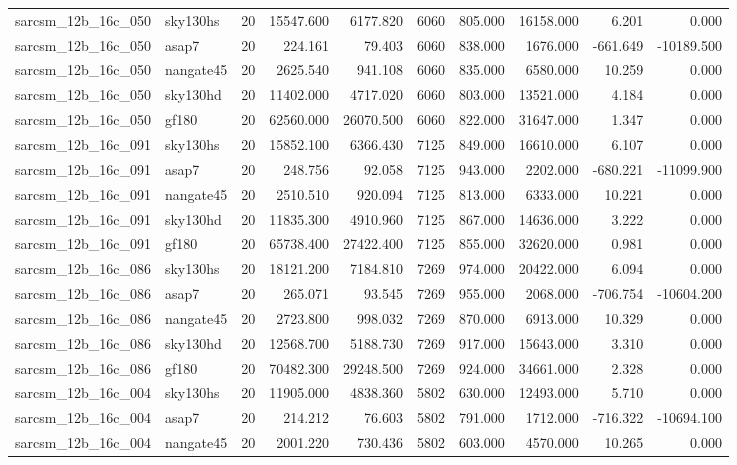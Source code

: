 \documentclass{article}
\begin{document}
\begin{longtable}{llrrrrrrrr}
sarcsm\_12b\_16c\_050 & sky130hs & 20 & 15547.600 & 6177.820 & 6060 & 805.000 & 16158.000 & 6.201 & 0.000 \\
sarcsm\_12b\_16c\_050 & asap7 & 20 & 224.161 & 79.403 & 6060 & 838.000 & 1676.000 & -661.649 & -10189.500 \\
sarcsm\_12b\_16c\_050 & nangate45 & 20 & 2625.540 & 941.108 & 6060 & 835.000 & 6580.000 & 10.259 & 0.000 \\
sarcsm\_12b\_16c\_050 & sky130hd & 20 & 11402.000 & 4717.020 & 6060 & 803.000 & 13521.000 & 4.184 & 0.000 \\
sarcsm\_12b\_16c\_050 & gf180 & 20 & 62560.000 & 26070.500 & 6060 & 822.000 & 31647.000 & 1.347 & 0.000 \\
sarcsm\_12b\_16c\_091 & sky130hs & 20 & 15852.100 & 6366.430 & 7125 & 849.000 & 16610.000 & 6.107 & 0.000 \\
sarcsm\_12b\_16c\_091 & asap7 & 20 & 248.756 & 92.058 & 7125 & 943.000 & 2202.000 & -680.221 & -11099.900 \\
sarcsm\_12b\_16c\_091 & nangate45 & 20 & 2510.510 & 920.094 & 7125 & 813.000 & 6333.000 & 10.221 & 0.000 \\
sarcsm\_12b\_16c\_091 & sky130hd & 20 & 11835.300 & 4910.960 & 7125 & 867.000 & 14636.000 & 3.222 & 0.000 \\
sarcsm\_12b\_16c\_091 & gf180 & 20 & 65738.400 & 27422.400 & 7125 & 855.000 & 32620.000 & 0.981 & 0.000 \\
sarcsm\_12b\_16c\_086 & sky130hs & 20 & 18121.200 & 7184.810 & 7269 & 974.000 & 20422.000 & 6.094 & 0.000 \\
sarcsm\_12b\_16c\_086 & asap7 & 20 & 265.071 & 93.545 & 7269 & 955.000 & 2068.000 & -706.754 & -10604.200 \\
sarcsm\_12b\_16c\_086 & nangate45 & 20 & 2723.800 & 998.032 & 7269 & 870.000 & 6913.000 & 10.329 & 0.000 \\
sarcsm\_12b\_16c\_086 & sky130hd & 20 & 12568.700 & 5188.730 & 7269 & 917.000 & 15643.000 & 3.310 & 0.000 \\
sarcsm\_12b\_16c\_086 & gf180 & 20 & 70482.300 & 29248.500 & 7269 & 924.000 & 34661.000 & 2.328 & 0.000 \\
sarcsm\_12b\_16c\_004 & sky130hs & 20 & 11905.000 & 4838.360 & 5802 & 630.000 & 12493.000 & 5.710 & 0.000 \\
sarcsm\_12b\_16c\_004 & asap7 & 20 & 214.212 & 76.603 & 5802 & 791.000 & 1712.000 & -716.322 & -10694.100 \\
sarcsm\_12b\_16c\_004 & nangate45 & 20 & 2001.220 & 730.436 & 5802 & 603.000 & 4570.000 & 10.265 & 0.000 \\

\end{longtable}
\end{document}
